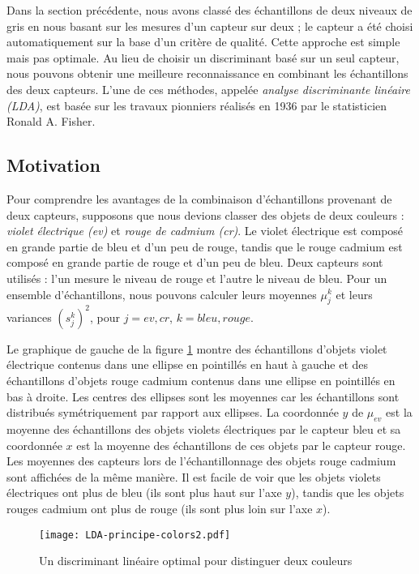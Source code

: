 Dans la section précédente, nous avons classé des échantillons de deux niveaux de gris en nous basant sur les mesures d'un capteur sur deux ; le capteur a été choisi automatiquement sur la base d'un critère de qualité. Cette approche est simple mais pas optimale. Au lieu de choisir un discriminant basé sur un seul capteur, nous pouvons obtenir une meilleure reconnaissance en combinant les échantillons des deux capteurs. L'une de ces méthodes, appelée \emph{analyse discriminante linéaire (LDA)}, est basée sur les travaux pionniers réalisés en 1936 par le statisticien Ronald A. Fisher.

\subsection{Motivation}

Pour comprendre les avantages de la combinaison d'échantillons provenant de deux capteurs, supposons que nous devions classer des objets de deux couleurs : \emph{violet électrique (ev)} et \emph{rouge de cadmium (cr)}. Le violet électrique est composé en grande partie de bleu et d'un peu de rouge, tandis que le rouge cadmium est composé en grande partie de rouge et d'un peu de bleu. Deux capteurs sont utilisés : l'un mesure le niveau de rouge et l'autre le niveau de bleu. Pour un ensemble d'échantillons, nous pouvons calculer leurs moyennes $\mu_j^k$ et leurs variances $(s_j^k)^2$, pour $j=\mathit{ev}, \mathit{cr}$, $k=\mathit{bleu}, \mathit{rouge}$.

Le graphique de gauche de la figure \ref{fig.LDAprincipe} montre des échantillons d'objets violet électrique contenus dans une ellipse en pointillés en haut à gauche et des échantillons d'objets rouge cadmium contenus dans une ellipse en pointillés en bas à droite. Les centres des ellipses sont les moyennes car les échantillons sont distribués symétriquement par rapport aux ellipses. La coordonnée $y$ de $\mu_{ev}$ est la moyenne des échantillons des objets violets électriques par le capteur bleu et sa coordonnée $x$ est la moyenne des échantillons de ces objets par le capteur rouge. Les moyennes des capteurs lors de l'échantillonnage des objets rouge cadmium sont affichées de la même manière. Il est facile de voir que les objets violets électriques ont plus de bleu (ils sont plus haut sur l'axe $y$), tandis que les objets rouges cadmium ont plus de rouge (ils sont plus loin sur l'axe $x$).

\begin{figure}
\begin{center}
\texttt{[image: LDA-principe-colors2.pdf]}
\end{center}
\caption{Un discriminant linéaire optimal pour distinguer deux couleurs}\label{fig.LDAprincipe}
\end{figure}

